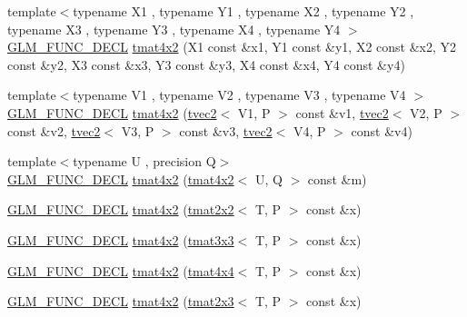 \begin{DoxyCompactItemize}
\item 
{\footnotesize template$<$typename X1 , typename Y1 , typename X2 , typename Y2 , typename X3 , typename Y3 , typename X4 , typename Y4 $>$ }\\\hyperlink{setup_8hpp_ab2d052de21a70539923e9bcbf6e83a51}{G\+L\+M\+\_\+\+F\+U\+N\+C\+\_\+\+D\+E\+CL} \hyperlink{structglm_1_1detail_1_1tmat4x2_a7999df24927e0ce901b39f396c529692}{tmat4x2} (X1 const \&x1, Y1 const \&y1, X2 const \&x2, Y2 const \&y2, X3 const \&x3, Y3 const \&y3, X4 const \&x4, Y4 const \&y4)
\item 
{\footnotesize template$<$typename V1 , typename V2 , typename V3 , typename V4 $>$ }\\\hyperlink{setup_8hpp_ab2d052de21a70539923e9bcbf6e83a51}{G\+L\+M\+\_\+\+F\+U\+N\+C\+\_\+\+D\+E\+CL} \hyperlink{structglm_1_1detail_1_1tmat4x2_abbb030181da4728bc6d618aa24aa17a8}{tmat4x2} (\hyperlink{structglm_1_1detail_1_1tvec2}{tvec2}$<$ V1, P $>$ const \&v1, \hyperlink{structglm_1_1detail_1_1tvec2}{tvec2}$<$ V2, P $>$ const \&v2, \hyperlink{structglm_1_1detail_1_1tvec2}{tvec2}$<$ V3, P $>$ const \&v3, \hyperlink{structglm_1_1detail_1_1tvec2}{tvec2}$<$ V4, P $>$ const \&v4)
\item 
{\footnotesize template$<$typename U , precision Q$>$ }\\\hyperlink{setup_8hpp_ab2d052de21a70539923e9bcbf6e83a51}{G\+L\+M\+\_\+\+F\+U\+N\+C\+\_\+\+D\+E\+CL} \hyperlink{structglm_1_1detail_1_1tmat4x2_a4aa43b25aaebbe320d3442f1a222c229}{tmat4x2} (\hyperlink{structglm_1_1detail_1_1tmat4x2}{tmat4x2}$<$ U, Q $>$ const \&m)
\item 
\hyperlink{setup_8hpp_ab2d052de21a70539923e9bcbf6e83a51}{G\+L\+M\+\_\+\+F\+U\+N\+C\+\_\+\+D\+E\+CL} \hyperlink{structglm_1_1detail_1_1tmat4x2_a0092bc7d0c201c76adfe3ae1b7a78cdf}{tmat4x2} (\hyperlink{structglm_1_1detail_1_1tmat2x2}{tmat2x2}$<$ T, P $>$ const \&x)
\item 
\hyperlink{setup_8hpp_ab2d052de21a70539923e9bcbf6e83a51}{G\+L\+M\+\_\+\+F\+U\+N\+C\+\_\+\+D\+E\+CL} \hyperlink{structglm_1_1detail_1_1tmat4x2_a1c7da56ef91ddbc093c429aa5e02da6b}{tmat4x2} (\hyperlink{structglm_1_1detail_1_1tmat3x3}{tmat3x3}$<$ T, P $>$ const \&x)
\item 
\hyperlink{setup_8hpp_ab2d052de21a70539923e9bcbf6e83a51}{G\+L\+M\+\_\+\+F\+U\+N\+C\+\_\+\+D\+E\+CL} \hyperlink{structglm_1_1detail_1_1tmat4x2_a5a1ee2297426e9d916cef04f76bf7030}{tmat4x2} (\hyperlink{structglm_1_1detail_1_1tmat4x4}{tmat4x4}$<$ T, P $>$ const \&x)
\item 
\hyperlink{setup_8hpp_ab2d052de21a70539923e9bcbf6e83a51}{G\+L\+M\+\_\+\+F\+U\+N\+C\+\_\+\+D\+E\+CL} \hyperlink{structglm_1_1detail_1_1tmat4x2_af72c0575d3315a1a7b434dabcefea5aa}{tmat4x2} (\hyperlink{structglm_1_1detail_1_1tmat2x3}{tmat2x3}$<$ T, P $>$ const \&x)

\end{DoxyCompactItemize}
